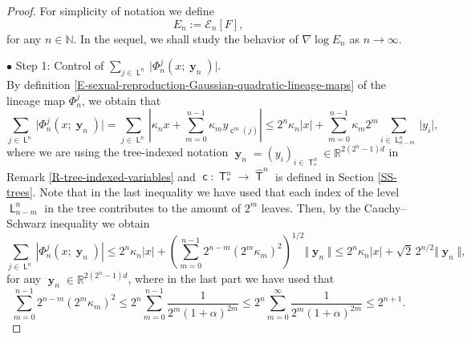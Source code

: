 \documentclass[reqno]{amsart}
\DeclareMathOperator{\Tree}{\mathsf{T}}
\DeclareMathOperator{\Leaves}{\mathsf{L}}
\DeclareMathOperator{\Level}{\mathsf{L}}
\DeclareMathOperator{\child}{\mathsf{c}}
\DeclareMathOperator{\by}{\mathbf{y}}
\numberwithin{equation}{section}
\begin{document}
{\begin{proof}
For simplicity of notation we define 
$$E_n:=\mathcal{E}_n[F],$$
for any $n\in \mathbb{N}$. In the sequel, we shall study the behavior of $\nabla\log E_n$ as $n\rightarrow \infty$.

\medskip

$\bullet$ {\sc Step 1}: Control of $\sum_{j\in \Leaves^n}\vert\Phi^j_n(x;\by_n)\vert$.\\
By definition \eqref{E-sexual-reproduction-Gaussian-quadratic-lineage-maps} of the lineage map $\Phi^j_n$, we obtain that
$$\sum_{j\in \Leaves^n}\vert \Phi^j_n(x;\by_n)\vert=\sum_{j\in \Leaves^n}\left\vert \kappa_n x+\sum_{m=0}^{n-1}\kappa_m y_{\child^m(j)}\right\vert\leq 2^n\kappa_n\vert x\vert+\sum_{m=0}^{n-1}\kappa_m 2^m\sum_{i\in \Level_{n-m}^n}\vert y_i\vert,$$
where we are using the tree-indexed notation $\by_n=(y_i)_{i\in \Tree^n_*}\in \mathbb{R}^{2(2^n-1)d}$ in Remark \ref{R-tree-indexed-variables} and $\child:\Tree^n_*\longrightarrow \widehat{\Tree}^n$ is defined in Section \ref{SS-trees}. Note that in the last inequality we have used that each index of the level $\Level_{n-m}^n$ in the tree contributes to the amount of $2^m$ leaves. Then, by the Cauchy--Schwarz inequality we obtain
\begin{equation}\label{E-sexual-reproduction-barX-sum}
\sum_{j\in \Leaves^n}\left\vert \Phi^j_n(x;\by_n)\right\vert \leq 2^n\kappa_n\vert x\vert+ \left(\sum_{m=0}^{n-1}2^{n-m}(2^m\kappa_m)^2\right)^{1/2}\Vert \by_n\Vert\leq 2^n\kappa_n\vert x\vert+\sqrt{2} \,2^{n/2} \Vert \by_n\Vert,
\end{equation}
for any $\by_n\in \mathbb{R}^{2(2^n-1)d}$, where in the last part we have used that
$$\sum_{m=0}^{n-1} 2^{n-m}(2^m\kappa_m)^2\leq 2^n\sum_{m=0}^{n-1}\frac{1}{2^m(1+\alpha)^{2m}}\leq 2^n\sum_{m=0}^\infty \frac{1}{2^m(1+\alpha)^{2m}}\leq 2^{n+1}.$$


\medskip


\end{proof}}
\end{document}
